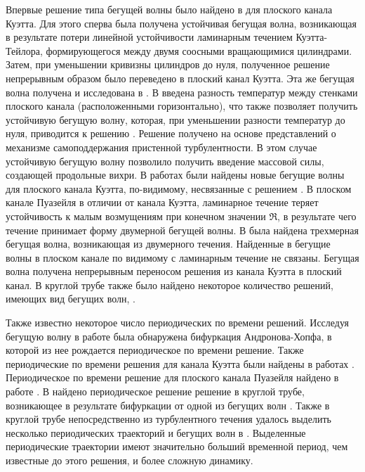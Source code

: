 Впервые решение типа бегущей волны было найдено в \cite{Nagata1990} для плоского канала Куэтта. Для этого сперва была получена устойчивая бегущая волна, возникающая в результате потери линейной устойчивости ламинарным течением Куэтта-Тейлора, формирующегося между двумя соосными вращающимися цилиндрами. Затем, при уменьшении кривизны цилиндров до нуля, полученное решение непрерывным образом было переведено в плоский канал Куэтта. Эта же бегущая волна получена и исследована в \cite{Clever1992, Waleffe1998, Waleffe2003}. В \cite{Clever1992} введена разность температур между стенками плоского канала (расположенными горизонтально), что также позволяет получить устойчивую бегущую волну, которая, при уменьшении разности температур до нуля, приводится к решению \cite{Nagata1990}. Решение \cite{Waleffe1998, Waleffe2003} получено на основе представлений о механизме самоподдержания пристенной турбулентности. В этом случае устойчивую бегущую волну позволило получить введение массовой силы, создающей продольные вихри. В работах \cite{Gibson2008, Gibson2009, Itano2009, Nagata1997, Schmiegel1999} были найдены новые бегущие волны для плоского канала Куэтта, по-видимому, несвязанные с решением \cite{Nagata1990}. В плоском канале Пуазейля в отличии от канала Куэтта, ламинарное течение теряет устойчивость к малым возмущениям при конечном значении $\Re$, в результате чего течение принимает форму двумерной бегущей волны. В \cite{Ehrenstein1991} была найдена трехмерная бегущая волна, возникающая из двумерного течения. Найденные в \cite{Waleffe1998, Waleffe2001, Waleffe2003, Itano2001} бегущие волны в плоском канале по видимому с ламинарным течение не связаны. Бегущая волна \cite{Waleffe1998, Waleffe2001, Waleffe2003} получена непрерывным переносом решения \cite{Nagata1990} из канала Куэтта в плоский канал. В круглой трубе также было найдено некоторое количество решений, имеющих вид бегущих волн, \cite{Faisst2003, Wedin2004, Pringle2007, Pringle2009}. \cite{Kerswell2007}

Также известно некоторое число периодических по времени решений. Исследуя бегущую волну \cite{Nagata1990} в работе \cite{Clever1997} была обнаружена бифуркация Андронова-Хопфа, в которой из нее рождается периодическое по времени решение. Также периодические по времени решения для канала Куэтта были найдены в работах \cite{Kawahara2001, Viswanath2007}. Периодическое по времени решение для плоского канала Пуазейля найдено в работе \cite{Toh2003}. В \cite{Duguet2008} найдено периодическое решение решение в круглой трубе, возникающее в результате бифуркации от одной из бегущих волн \cite{Pringle2007}. Также в круглой трубе непосредственно из турбулентного течения удалось выделить несколько периодических траекторий и бегущих волн в \cite{Altmeyer2015}. Выделенные периодические траектории имеют значительно больший временной период, чем известные до этого решения, и более сложную динамику. 

